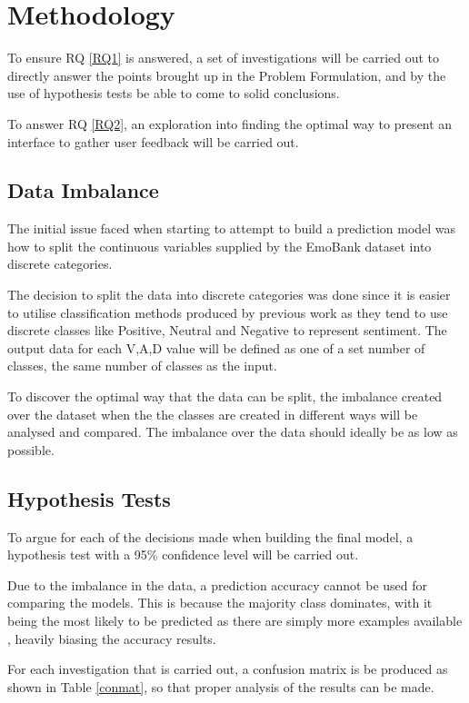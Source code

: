    
\section{Methodology}
 
To ensure RQ \ref{RQ1} is answered, a set of investigations will be carried out to directly answer the points brought up in the Problem Formulation, and by the use of hypothesis tests be able to come to solid conclusions. 

To answer RQ \ref{RQ2}, an exploration into finding the optimal way to present an interface to gather user feedback will be carried out.

\subsection{Data Imbalance}

The initial issue faced when starting to attempt to build a prediction model was how to split the continuous variables supplied by the EmoBank dataset into discrete categories.

The decision to split the data into discrete categories was done since it is easier to utilise classification methods produced by previous work as they tend to use discrete classes like Positive, Neutral and Negative to represent sentiment. The output data for each V,A,D value will be defined as one of a set number of classes, the same number of classes as the input.

To discover the optimal way that the data can be split, the imbalance created over the dataset when the the classes are created in different ways will be analysed and compared. The imbalance over the data should ideally be as low as possible.

\subsection{Hypothesis Tests}

To argue for each of the decisions made when building the final model, a hypothesis test with a 95\% confidence level will be carried out.

Due to the imbalance in the data, a prediction accuracy cannot be used for comparing the models. This is because the majority class dominates, with it being the most likely to be predicted as there are simply more examples available \cite{al2015applied}, heavily biasing the accuracy results.

For each investigation that is carried out, a confusion matrix is be produced as shown in Table \ref{conmat}, so that proper analysis of the results can be made.

